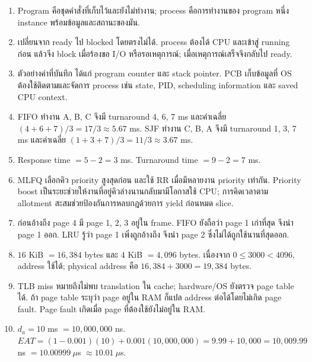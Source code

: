 \newpage{}
\begin{enumerate}[leftmargin=1.4em,itemsep=.18cm]
\item Program คือชุดคำสั่งที่เก็บไว้และยังไม่ทำงาน; process คือการทำงานของ program หนึ่ง instance พร้อมข้อมูลและสถานะของมัน.
\item เปลี่ยนจาก ready ไป blocked โดยตรงไม่ได้. process ต้องได้ CPU และเข้าสู่ running ก่อน แล้วจึง block เมื่อร้องขอ I/O หรือรอเหตุการณ์; เมื่อเหตุการณ์เสร็จจึงกลับไป ready.
\item ตัวอย่างค่าที่บันทึก ได้แก่ program counter และ stack pointer. PCB เก็บข้อมูลที่ OS ต้องใช้ติดตามและจัดการ process เช่น state, PID, scheduling information และ saved CPU context.
\item FIFO ทำงาน A, B, C จึงมี turnaround 4, 6, 7 ms และค่าเฉลี่ย $(4+6+7)/3=17/3\approx5.67$ ms. SJF ทำงาน C, B, A จึงมี turnaround 1, 3, 7 ms และค่าเฉลี่ย $(1+3+7)/3=11/3\approx3.67$ ms.
\item Response time $=5-2=3$ ms. Turnaround time $=9-2=7$ ms.
\item MLFQ เลือกคิว priority สูงสุดก่อน และใช้ RR เมื่อมีหลายงาน priority เท่ากัน. Priority boost เป็นระยะช่วยให้งานที่อยู่คิวล่างนานกลับมามีโอกาสใช้ CPU; การคิดเวลาตาม allotment สะสมช่วยป้องกันการหลบกฎด้วยการ yield ก่อนหมด slice.
\item ก่อนอ้างถึง page 4 มี page 1, 2, 3 อยู่ใน frame. FIFO ยังถือว่า page 1 เก่าที่สุด จึงนำ page 1 ออก. LRU รู้ว่า page 1 เพิ่งถูกอ้างถึง จึงนำ page 2 ซึ่งไม่ได้ถูกใช้นานที่สุดออก.
\item $16$ KiB $=16{,}384$ bytes และ $4$ KiB $=4{,}096$ bytes. เนื่องจาก $0\leq3000<4096$, address ใช้ได้; physical address คือ $16{,}384+3000=19{,}384$ bytes.
\item TLB miss หมายถึงไม่พบ translation ใน cache; hardware/OS ยังตรวจ page table ได้. ถ้า page table ระบุว่า page อยู่ใน RAM ก็แปล address ต่อได้โดยไม่เกิด page fault. Page fault เกิดเมื่อ page ที่ต้องใช้ยังไม่อยู่ใน RAM.
\item $d_a=10$ ms $=10{,}000{,}000$ ns.\\$EAT=(1-0.001)(10)+0.001(10{,}000{,}000)=9.99+10{,}000=10{,}009.99$ ns $=10.00999\ \mu$s $\approx10.01\ \mu$s.
\end{enumerate}
